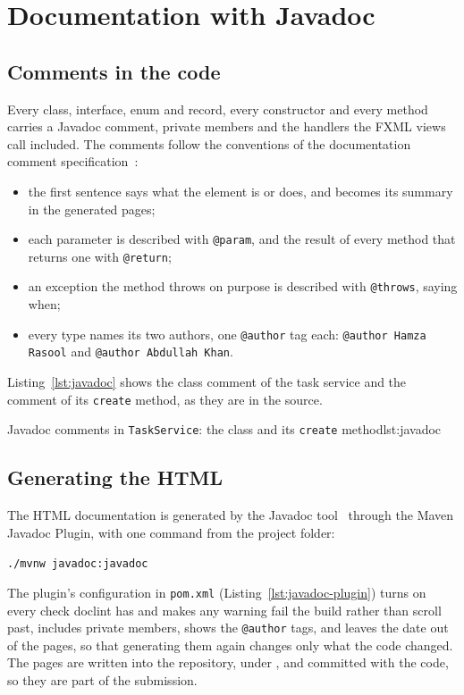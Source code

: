 \section{Documentation with Javadoc}\label{sec:javadoc}

\subsection{Comments in the code}

Every class, interface, enum and record, every constructor and every method carries a Javadoc comment, private
members and the handlers the FXML views call included. The comments follow the conventions of the documentation
comment specification~\cite{doc-comment-spec}:
\begin{itemize}
  \item the first sentence says what the element is or does, and becomes its summary in the generated pages;
  \item each parameter is described with \texttt{@param}, and the result of every method that returns one with
        \texttt{@return};
  \item an exception the method throws on purpose is described with \texttt{@throws}, saying when;
  \item every type names its two authors, one \texttt{@author} tag each: \texttt{@author Hamza Rasool} and
        \texttt{@author Abdullah Khan}.
\end{itemize}
Listing~\ref{lst:javadoc} shows the class comment of the task service and the comment of its \texttt{create} method,
as they are in the source.

  {Javadoc comments in \texttt{TaskService}: the class and its \texttt{create} method}{lst:javadoc}

\subsection{Generating the HTML}

The HTML documentation is generated by the Javadoc tool~\cite{javadoc-tool} through the Maven Javadoc Plugin, with one
command from the project folder:
\begin{center}
  \texttt{./mvnw javadoc:javadoc}
\end{center}
The plugin's configuration in \texttt{pom.xml} (Listing~\ref{lst:javadoc-plugin}) turns on every check doclint has
and makes any warning fail the build rather than scroll past, includes private members, shows the \texttt{@author}
tags, and leaves the date out of the pages, so that generating them again changes only what the code changed. The
pages are written into the repository, under , and committed with the code, so they are
part of the submission.


